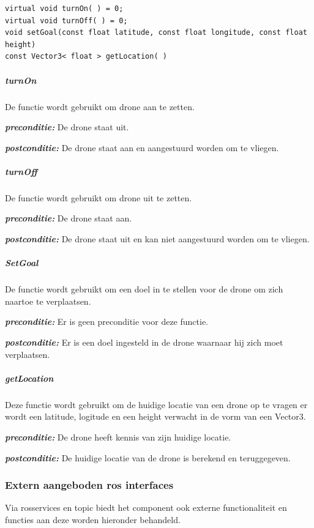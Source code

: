 \documentclass[a4paper, 11pt, oneside]{report}
\begin{document}
\begin{lstlisting}
virtual void turnOn( ) = 0;
virtual void turnOff( ) = 0;
void setGoal(const float latitude, const float longitude, const float height)
const Vector3< float > getLocation( )
\end{lstlisting}

\subparagraph{turnOn}
\label{DetailedDesign:ros:extern:interfaces:IDroneEngine:turnOn}
De functie wordt gebruikt om drone aan te zetten.

\textbf{\textit{preconditie:}} De drone staat uit.

\textbf{\textit{postconditie:}} De drone staat aan en aangestuurd worden om te vliegen.


\subparagraph{turnOff}
\label{DetailedDesign:ros:extern:interfaces:IDroneEngine:turnOff}
De functie wordt gebruikt om drone uit te zetten.

\textbf{\textit{preconditie:}} De drone staat aan.

\textbf{\textit{postconditie:}} De drone staat uit en kan niet aangestuurd worden om te vliegen.



\subparagraph{SetGoal}
\label{DetailedDesign:ros:extern:interfaces:IDroneEngine:SetGoal}
De functie wordt gebruikt om een doel in te stellen voor de drone om zich naartoe te verplaatsen.

\textbf{\textit{preconditie:}} Er is geen preconditie voor deze functie.

\textbf{\textit{postconditie:}} Er is een doel ingesteld in de drone waarnaar hij zich moet verplaatsen.


\subparagraph{getLocation}
\label{DetailedDesign:ros:extern:interfaces:IDroneEngine:getLocation}
Deze functie wordt gebruikt om de huidige locatie van een drone op te vragen er wordt een latitude, logitude en een height verwacht in de vorm van een Vector3.

\textbf{\textit{preconditie:}} De drone heeft kennis van zijn huidige locatie.

\textbf{\textit{postconditie:}} De huidige locatie van de drone is berekend en teruggegeven.

\subsubsection{Extern aangeboden ros interfaces}
\label{DetailedDesign:ros:extern:rosinterfaces}
Via rosservices en topic biedt het component ook externe functionaliteit en functies aan deze worden hieronder behandeld.
\end{document}
